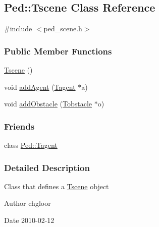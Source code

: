 \hypertarget{classPed_1_1Tscene}{
\subsection{Ped::Tscene Class Reference}
\label{classPed_1_1Tscene}
}


{\ttfamily \#include $<$ped\_\-scene.h$>$}

\subsubsection*{Public Member Functions}
\begin{DoxyCompactItemize}
\item 
\hyperlink{classPed_1_1Tscene_a992fa125d69d1aa82da9d1f295237175}{Tscene} ()
\item 
void \hyperlink{classPed_1_1Tscene_a15d4cce45654cdcba965e85d0430835f}{addAgent} (\hyperlink{classPed_1_1Tagent}{Tagent} $\ast$a)
\item 
void \hyperlink{classPed_1_1Tscene_ae1287b2e020e05735ef468c62e70056c}{addObstacle} (\hyperlink{classPed_1_1Tobstacle}{Tobstacle} $\ast$o)
\end{DoxyCompactItemize}
\subsubsection*{Friends}
\begin{DoxyCompactItemize}
\item 
\hypertarget{classPed_1_1Tscene_aab62bf349ba26de1870ac6fa2cb05754}{
class \hyperlink{classPed_1_1Tscene_aab62bf349ba26de1870ac6fa2cb05754}{Ped::Tagent}}
\label{classPed_1_1Tscene_aab62bf349ba26de1870ac6fa2cb05754}

\end{DoxyCompactItemize}


\subsubsection{Detailed Description}
Class that defines a \hyperlink{classPed_1_1Tscene}{Tscene} object \begin{DoxyAuthor}{Author}
chgloor 
\end{DoxyAuthor}
\begin{DoxyDate}{Date}
2010-\/02-\/12 
\end{DoxyDate}



